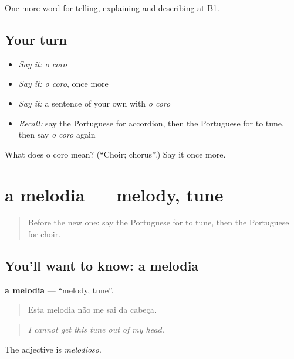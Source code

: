 \begin{grammarlens}[title={What you've built}]
One more word for telling, explaining and describing at B1.
\end{grammarlens}

\subsection*{Your turn}
\begin{itemize}
\raggedright
  \item \emph{Say it:} \emph{o coro}
  \item \emph{Say it:} \emph{o coro}, once more
  \item \emph{Say it:} a sentence of your own with \emph{o coro}
  \item \emph{Recall:} say the Portuguese for accordion, then the Portuguese for to tune, then say \emph{o coro} again
\end{itemize}

\begin{tcolorbox}[breakable,colback=teal!4,colframe=teal!35!black,title={Before you move on}]
What does o coro mean? (\textquotedblleft{}Choir; chorus\textquotedblright{}.) Say it once more.
\end{tcolorbox}
\section[a melodia]{a melodia — melody, tune}

\label{lesson:PT-C518-melodia}



\begin{quote}
Before the new one: say the Portuguese for to tune, then the Portuguese for choir.
\end{quote}

\subsection*{You'll want to know: a melodia}
\textbf{a melodia} — \textquotedblleft{}melody, tune\textquotedblright{}.

\begin{quote}
Esta melodia não me sai da cabeça.
\end{quote}

\begin{quote}
\emph{I cannot get this tune out of my head.}
\end{quote}

The adjective is \emph{melodioso}.


